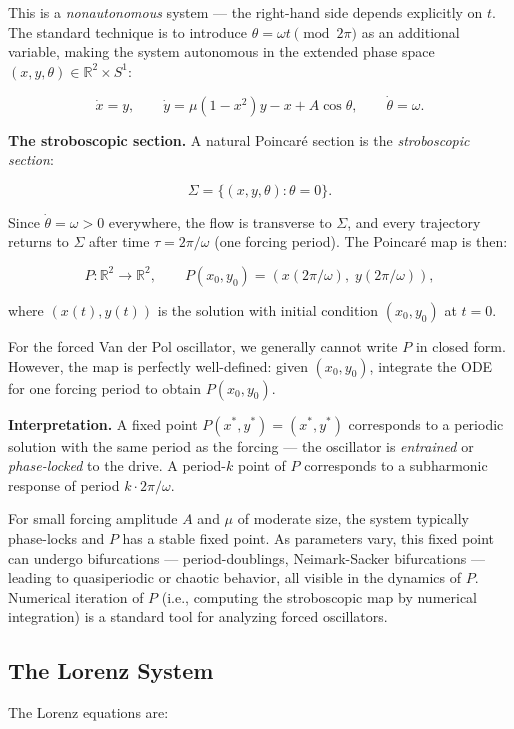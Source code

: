 This is a \textit{nonautonomous} system --- the right-hand side depends explicitly on $t$. The standard technique is to introduce $\theta = \omega t \pmod{2\pi}$ as an additional variable, making the system autonomous in the extended phase space $(x, y, \theta) \in \mathbb{R}^2 \times S^1$:

\[
\dot{x} = y, \qquad \dot{y} = \mu(1 - x^2)y - x + A\cos\theta, \qquad \dot{\theta} = \omega.
\]

\textbf{The stroboscopic section.} A natural Poincaré section is the \textit{stroboscopic section}:

\[
\Sigma = \{(x, y, \theta) : \theta = 0\}.
\]

Since $\dot{\theta} = \omega > 0$ everywhere, the flow is transverse to $\Sigma$, and every trajectory returns to $\Sigma$ after time $\tau = 2\pi/\omega$ (one forcing period). The Poincaré map is then:

\[
P: \mathbb{R}^2 \to \mathbb{R}^2, \qquad P(x_0, y_0) = (x(2\pi/\omega), \; y(2\pi/\omega)),
\]

where $(x(t), y(t))$ is the solution with initial condition $(x_0, y_0)$ at $t = 0$.

For the forced Van der Pol oscillator, we generally cannot write $P$ in closed form. However, the map is perfectly well-defined: given $(x_0, y_0)$, integrate the ODE for one forcing period to obtain $P(x_0, y_0)$.

\textbf{Interpretation.} A fixed point $P(x^*, y^*) = (x^*, y^*)$ corresponds to a periodic solution with the same period as the forcing --- the oscillator is \textit{entrained} or \textit{phase-locked} to the drive. A period-$k$ point of $P$ corresponds to a subharmonic response of period $k \cdot 2\pi/\omega$.

For small forcing amplitude $A$ and $\mu$ of moderate size, the system typically phase-locks and $P$ has a stable fixed point. As parameters vary, this fixed point can undergo bifurcations --- period-doublings, Neimark-Sacker bifurcations --- leading to quasiperiodic or chaotic behavior, all visible in the dynamics of $P$. Numerical iteration of $P$ (i.e., computing the stroboscopic map by numerical integration) is a standard tool for analyzing forced oscillators.

\subsection{The Lorenz System}\label{sec:4.3.3}

The Lorenz equations are:

